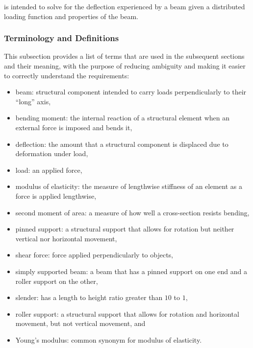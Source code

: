 \documentclass[12pt]{article}
\begin{document}
\progname{} is intended to solve for the deflection experienced by a beam given
a distributed loading function and properties of the beam.

\subsubsection{Terminology and  Definitions}

This subsection provides a list of terms that are used in the subsequent
sections and their meaning, with the purpose of reducing ambiguity and making it
easier to correctly understand the requirements:

\begin{itemize}

    \item beam: structural component intended to carry loads perpendicularly to
          their ``long'' axis\nc{},

    \item bending moment: the internal reaction of a structural element when an
          external force is imposed and bends it\nc{},

    \item deflection: the amount that a structural component is displaced due to
          deformation under load\nc{},

    \item load: an applied force\nc{},

    \item modulus of elasticity: the measure of lengthwise stiffness of an
          element as a force is applied lengthwise\nc{},

    \item second moment of area: a measure of how well a cross-section resists
          bending\cite{SmithAdviceAndDiscussion2023},

    \item pinned support: a structural support that allows for rotation but
          neither vertical nor horizontal movement\nc{},

    \item shear force: force applied perpendicularly to objects\nc{},

    \item simply supported beam: a beam that has a pinned support on one end and
          a roller support on the other\nc{},

    \item slender: has a length to height ratio greater than \(10\) to \(1\),

    \item roller support: a structural support that allows for rotation and
          horizontal movement, but not vertical movement\nc{}, and

    \item Young's modulus: common synonym for modulus of elasticity\nc{}.

\end{itemize}
\end{document}

